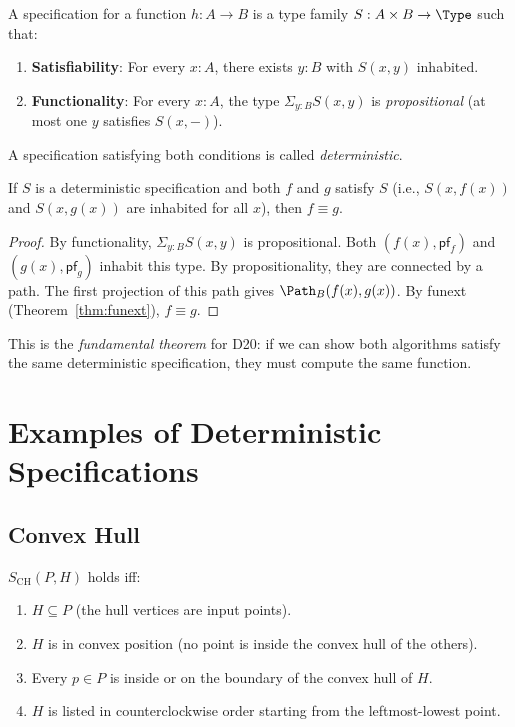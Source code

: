 \begin{definition}[Specification]
A specification for a function $h : A \to B$ is a type family
$S : A \times B \to \Type$ such that:
\begin{enumerate}
  \item \textbf{Satisfiability}: For every $x : A$, there exists
    $y : B$ with $S(x, y)$ inhabited.
  \item \textbf{Functionality}: For every $x : A$, the type
    $\Sigma_{y:B} S(x, y)$ is \emph{propositional} (at most one
    $y$ satisfies $S(x, -)$).
\end{enumerate}
A specification satisfying both conditions is called
\emph{deterministic}.
\end{definition}

\begin{theorem}
\label{thm:det-spec}
If $S$ is a deterministic specification and both $f$ and $g$ satisfy
$S$ (i.e., $S(x, f(x))$ and $S(x, g(x))$ are inhabited for all $x$),
then $f \equiv g$.
\end{theorem}

\begin{proof}
By functionality, $\Sigma_{y:B} S(x, y)$ is propositional.  Both
$(f(x), \mathsf{pf}_f)$ and $(g(x), \mathsf{pf}_g)$ inhabit this
type.  By propositionality, they are connected by a path.  The first
projection of this path gives $\Path_B(f(x), g(x))$.  By funext
(Theorem~\ref{thm:funext}), $f \equiv g$.
\end{proof}

This is the \emph{fundamental theorem} for D20: if we can show
both algorithms satisfy the same deterministic specification,
they must compute the same function.

\section{Examples of Deterministic Specifications}

\subsection{Convex Hull}

\begin{definition}
$S_{\mathrm{CH}}(P, H)$ holds iff:
\begin{enumerate}
  \item $H \subseteq P$ (the hull vertices are input points).
  \item $H$ is in convex position (no point is inside the convex
    hull of the others).
  \item Every $p \in P$ is inside or on the boundary of the convex
    hull of $H$.
  \item $H$ is listed in counterclockwise order starting from the
    leftmost-lowest point.
\end{enumerate}
\end{definition}

